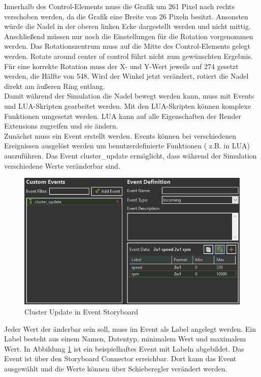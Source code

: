 Innerhalb des Control-Elements muss die Grafik um 261 Pixel nach rechts verschoben werden, da die Grafik eine Breite von 26 Pixeln besitzt. Ansonsten würde die Nadel in der oberen linken Ecke dargestellt werden und nicht mittig. Anschließend müssen nur noch die Einstellungen für die Rotation vorgenommen werden. Das Rotationszentrum muss auf die Mitte des Control-Elements gelegt werden. \glqq Rotate around center of control\grqq{} führt nicht zum gewünschten Ergebnis. Für eine korrekte Rotation muss der X- und Y-Wert jeweils auf 274 gesetzt werden, die Hälfte von 548. Wird der Winkel jetzt verändert, rotiert die Nadel direkt am äußeren Ring entlang.\\

Damit während der Simulation die Nadel bewegt werden kann, muss mit Events und LUA-Skripten gearbeitet werden. Mit den LUA-Skripten können komplexe Funktionen umgesetzt werden. LUA kann auf alle Eigenschaften der Render Extensions zugreifen und sie ändern.\\

Zunächst muss ein Event erstellt werden. Events können bei verschiedenen Ereignissen ausgelöst werden um benutzerdefinierte Funktionen ( z.B. in LUA) auszuführen. Das Event \glqq cluster\_update\grqq{} ermöglicht, dass während der Simulation verschiedene Werte veränderbar sind.\\

\begin{figure}[htb]
	\centering
	\includegraphics[width=\textwidth]{img/4_hmi_tools/event_indi_story}
	\caption{Cluster Update in Event Storyboard}
	\label{fig:event_story}
\end{figure}

Jeder Wert der änderbar sein soll, muss im Event als Label angelegt werden. Ein Label besteht aus einem Namen, Datentyp, minimalem Wert und maximalem Wert. In Abbildung \ref{fig:event_story} ist ein beispielhaftes Event mit Labeln abgebildet. Das Event ist über den Storyboard Connector erreichbar. Dort kann das Event ausgewählt und die Werte können über Schieberegler verändert werden.\\

